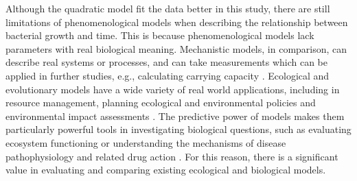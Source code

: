 \documentclass{article}[11pt]
\begin{document}
\begin{flushleft}
Although the quadratic model fit the data better in this study, there are still limitations of phenomenological models when describing the relationship between bacterial growth and time. This is because phenomenological models lack parameters with real biological meaning. Mechanistic models, in comparison, can describe real systems or processes, and can take measurements which can be applied in further studies, e.g., calculating carrying capacity \cite{white2019should}\cite{o1989multiple}. Ecological and evolutionary models have a wide variety of real world applications, including in resource management, planning ecological and environmental policies and environmental impact assessments \cite{o1989multiple}. The predictive power of models makes them particularly powerful tools in investigating biological questions, such as evaluating ecosystem functioning or understanding the mechanisms of disease pathophysiology and related drug action \cite{o1989multiple}\cite{brown2018applications}. For this reason, there is a significant value in evaluating and comparing existing ecological and biological models. 




\clearpage




\end{flushleft}
\end{document}
